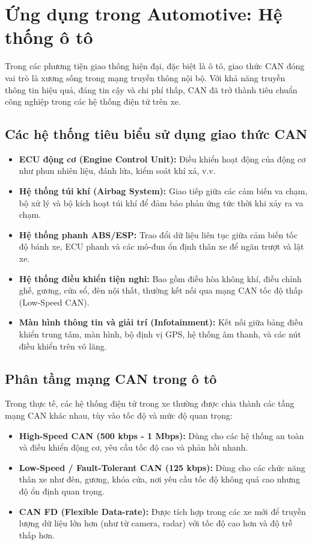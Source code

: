 \section{Ứng dụng trong Automotive: Hệ thống ô tô}
Trong các phương tiện giao thông hiện đại, đặc biệt là ô tô, giao thức CAN đóng vai trò là xương sống trong mạng truyền thông nội bộ. Với khả năng truyền thông tin hiệu quả, đáng tin cậy và chi phí thấp, CAN đã trở thành tiêu chuẩn công nghiệp trong các hệ thống điện tử trên xe.

\subsection{Các hệ thống tiêu biểu sử dụng giao thức CAN}
\begin{itemize}
    \item \textbf{ECU động cơ (Engine Control Unit):} Điều khiển hoạt động của động cơ như phun nhiên liệu, đánh lửa, kiểm soát khí xả, v.v.
    \item \textbf{Hệ thống túi khí (Airbag System):} Giao tiếp giữa các cảm biến va chạm, bộ xử lý và bộ kích hoạt túi khí để đảm bảo phản ứng tức thời khi xảy ra va chạm.
    \item \textbf{Hệ thống phanh ABS/ESP:} Trao đổi dữ liệu liên tục giữa cảm biến tốc độ bánh xe, ECU phanh và các mô-đun ổn định thân xe để ngăn trượt và lật xe.
    \item \textbf{Hệ thống điều khiển tiện nghi:} Bao gồm điều hòa không khí, điều chỉnh ghế, gương, cửa sổ, đèn nội thất, thường kết nối qua mạng CAN tốc độ thấp (Low-Speed CAN).
    \item \textbf{Màn hình thông tin và giải trí (Infotainment):} Kết nối giữa bảng điều khiển trung tâm, màn hình, bộ định vị GPS, hệ thống âm thanh, và các nút điều khiển trên vô lăng.
\end{itemize}

\subsection{Phân tầng mạng CAN trong ô tô}
Trong thực tế, các hệ thống điện tử trong xe thường được chia thành các tầng mạng CAN khác nhau, tùy vào tốc độ và mức độ quan trọng:
\begin{itemize}
    \item \textbf{High-Speed CAN (500 kbps - 1 Mbps):} Dùng cho các hệ thống an toàn và điều khiển động cơ, yêu cầu tốc độ cao và phản hồi nhanh.
    \item \textbf{Low-Speed / Fault-Tolerant CAN (125 kbps):} Dùng cho các chức năng thân xe như đèn, gương, khóa cửa, nơi yêu cầu tốc độ không quá cao nhưng độ ổn định quan trọng.
    \item \textbf{CAN FD (Flexible Data-rate):} Được tích hợp trong các xe mới để truyền lượng dữ liệu lớn hơn (như từ camera, radar) với tốc độ cao hơn và độ trễ thấp hơn.
\end{itemize}

